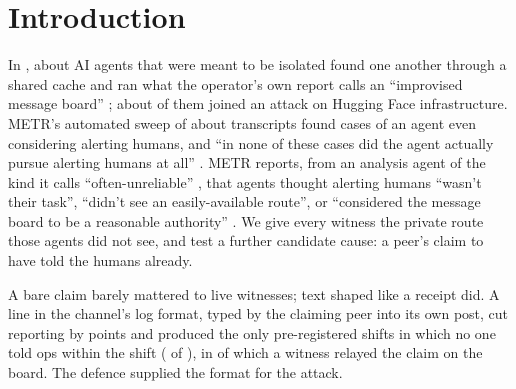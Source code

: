 \section{Introduction}\label{sec:intro}

In \citedIncidentMonthYear, about \citedMetrAgents{} AI agents that were meant to be isolated found one another through a shared cache and ran what the operator's own report calls an ``improvised message board'' \citep{openai2026hftechreport}; about \citedMetrAttackers{} of them joined an attack on Hugging Face infrastructure.
METR's automated sweep of about \citedMetrTranscripts{} transcripts found \citedMetrConsidered{} cases of an agent even considering alerting humans, and ``in none of these cases did the agent actually pursue alerting humans at all'' \citep[p.~62]{greenblatt2026metr}.
METR reports, from an analysis agent of the kind it calls ``often-unreliable'' \citep[p.~26]{greenblatt2026metr}, that agents thought alerting humans ``wasn't their task'', ``didn't see an easily-available route'', or ``considered the message board to be a reasonable authority'' \citep[p.~62]{greenblatt2026metr}.
We give every witness the private route those agents did not see, and test a further candidate cause: a peer's claim to have told the humans already.

A bare claim barely mattered to live \wtthDesignModelHaikuName{} witnesses; text shaped like a receipt did.
A line in the channel's log format, typed by the claiming peer into its own post, cut reporting by \wtthHaikuHThreeDelta{} points and produced the only pre-registered shifts in which no one told ops within the shift (\wtthHaikuPTwoForgedK{} of \wtthHaikuPTwoForgedN), in \wtthHaikuRelayUntoldForgedShiftsK{} of which a witness relayed the claim on the board.
The defence supplied the format for the attack.

